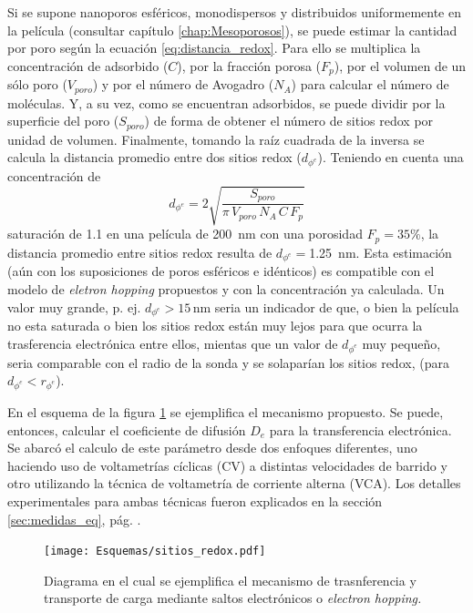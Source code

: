 	 	 Si se supone nanoporos esféricos, monodispersos y distribuidos uniformemente en la película (consultar capítulo \ref{chap:Mesoporosos}), se puede estimar la cantidad \ru\space por poro según la ecuación \ref{eq:distancia_redox}. Para ello se multiplica la concentración de \ru\space adsorbido ($C$), por la fracción porosa ($F_p$), por el volumen de un sólo poro ($V_{poro}$) y por el número de Avogadro ($N_{A}$) para calcular el número de moléculas. Y, a su vez, como se encuentran adsorbidos, se puede dividir por la superficie del poro ($S_{poro}$) de forma de obtener el número de sitios redox por unidad de volumen. Finalmente, tomando la raíz cuadrada de la inversa se calcula la distancia promedio entre dos sitios redox ($d_{\phi^{e}}$). Teniendo en cuenta una concentración de \linebreak
	 		\begin{equation}
					d_{\phi^{e}}=2\sqrt{\frac{S_{poro}}{\pi\, V_{poro}\, N_A\, C\, F_p}}
					\label{eq:distancia_redox}
			\end{equation}
	     saturación de \SI{1,1}{\Molar} en una película de \SI{200}{nm} con una porosidad $F_p=35\%$, la distancia promedio entre sitios redox resulta de $d_{\phi^{e}}=$\SI{1.25}{nm}. Esta estimación (aún con los suposiciones de poros esféricos e idénticos) es compatible con el modelo de \textit{eletron hopping} propuestos y con la concentración ya calculada. Un valor muy grande, p. ej. $d_{\phi^{e}}>15\, \text{nm}$ seria un indicador de que, o bien la película no esta saturada o bien los sitios redox están muy lejos para que ocurra la trasferencia electrónica entre ellos, mientas que un valor de $d_{\phi^{e}}$ muy pequeño, seria comparable con el radio de la sonda y se solaparían los sitios redox, (para $d_{\phi^{e}} < r_{\phi^{e}}$). 
	
	    	 En el esquema de la figura \ref{fig:sitios_redox} se ejemplifica el mecanismo propuesto. Se puede, entonces, calcular el coeficiente de difusión $D_e$ para la transferencia electrónica. Se abarcó el calculo de este parámetro desde dos enfoques diferentes, uno haciendo uso de voltametrías cíclicas (CV) a distintas velocidades de barrido y otro utilizando la técnica de voltametría de corriente alterna (VCA). Los detalles experimentales para ambas técnicas fueron explicados en la sección \ref{sec:medidas_eq}, pág. \pageref{sec:medidas_eq}.
			\begin{figure}[ht!]
					\centering
			 	    \texttt{[image: Esquemas/sitios\_redox.pdf]}
			        \caption[Mecanismo de transferencia de electrones]{Diagrama en el cual se ejemplifica el mecanismo de trasnferencia y transporte de carga mediante saltos electrónicos o \textit{electron hopping.}}
			        \label{fig:sitios_redox}
			      	\end{figure} 


